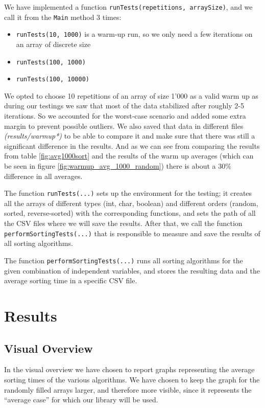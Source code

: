 \documentclass{article}
\begin{document}
        We have implemented a function \texttt{runTests(repetitions, arraySize)}, and we call it from the \texttt{Main} method 3 times:
        \begin{itemize}
            \item \texttt{runTests(10, 1000)} is a warm-up run, so we only need a few iterations on an array of discrete size
            \item \texttt{runTests(100, 1000)}
            \item \texttt{runTests(100, 10000)}
        \end{itemize}

        We opted to choose 10 repetitions of an array of size 1'000 as a valid warm up as during our testings we saw that most of the data stabilized after roughly 2-5 iterations. So we accounted for the worst-case scenario and added some extra margin to prevent possible outliers. We also saved that data in different files \textit{(results/warmup*)} to be able to compare it and make sure that there was still a significant difference in the results. And as we can see from comparing the results from table \ref{fig:avg1000sort} and the results of the warm up averages (which can be seen in figure \ref{fig:warmup_avg_1000_random}) there is about a 30\% difference in all averages.

        The function \texttt{runTests(...)} sets up the environment for the testing; it creates all the arrays of different types (int, char, boolean) and different orders (random, sorted, reverse-sorted) with the corresponding functions, and sets the path of all the CSV files where we will save the results. After that, we call the function \texttt{performSortingTests(...)} that is responsible to measure and save the results of all sorting algorithms.

        The function \texttt{performSortingTests(...)} runs all sorting algorithms for the given combination of independent variables, and stores the resulting data and the average sorting time in a specific CSV file.

\newpage
        
\section{Results}
    \subsection{Visual Overview}
    In the visual overview we have chosen to report graphs representing the average sorting times of the various algorithms. We have chosen to keep the graph for the randomly filled arrays larger, and therefore more visible, since it represents the “average case” for which our library will be used.
    
\end{document}
